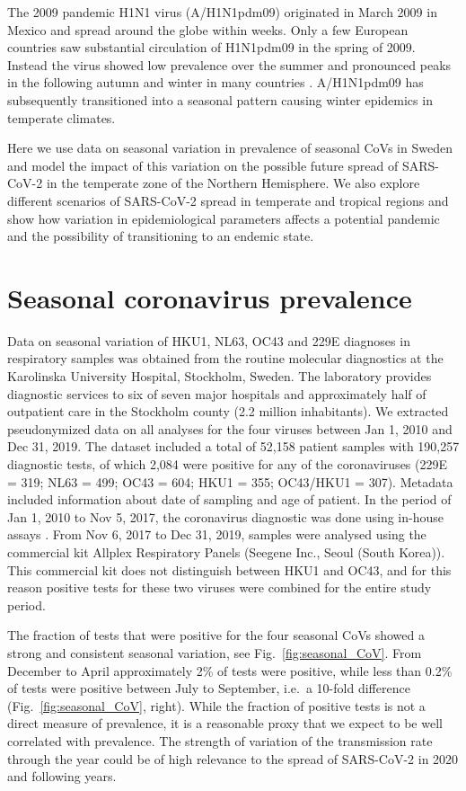\documentclass[rmp, reprint, superscriptaddress, floatfix,amsmath]{revtex4-1}
\begin{document}
The 2009 pandemic H1N1 virus (A/H1N1pdm09) originated in March 2009 in Mexico and spread around the globe within weeks.
Only a few European countries saw substantial circulation of H1N1pdm09 in the spring of 2009. Instead the virus showed low prevalence over the summer and pronounced peaks in the following autumn and winter in many countries \citep{amato-gauci_surveillance_2011}.
A/H1N1pdm09 has subsequently transitioned into a seasonal pattern causing winter epidemics in temperate climates.

Here we use data on seasonal variation in prevalence of seasonal CoVs in Sweden and model the impact of this variation on the possible future spread of SARS-CoV-2 in the temperate zone of the Northern Hemisphere.
We also explore different scenarios of SARS-CoV-2 spread in temperate and tropical regions and show how variation in epidemiological parameters affects a potential pandemic and the possibility of transitioning to an endemic state.

\section{Seasonal coronavirus prevalence}

Data on seasonal variation of HKU1, NL63, OC43 and 229E diagnoses in respiratory samples was obtained from the routine molecular diagnostics at the Karolinska University Hospital, Stockholm, Sweden. The laboratory provides diagnostic services to six of seven major hospitals and approximately half of outpatient care in the Stockholm county (2.2 million inhabitants). We extracted pseudonymized data on all analyses for the four viruses between Jan 1, 2010 and Dec 31, 2019. The dataset included a total of 52,158 patient samples with 190,257 diagnostic tests, of which 2,084 were positive for any of the coronaviruses (229E = 319; NL63 = 499; OC43 = 604; HKU1 = 355; OC43/HKU1 = 307). Metadata included information about date of sampling and age of patient.
In the period of Jan 1, 2010 to Nov 5, 2017, the coronavirus diagnostic was done using in-house assays \citep{tiveljung2009development}. From Nov 6, 2017 to Dec 31, 2019, samples were analysed using the commercial kit Allplex Respiratory Panels (Seegene Inc., Seoul (South Korea)). This commercial kit does not distinguish between HKU1 and OC43, and for this reason positive tests for these two viruses were combined for the entire study period.

The fraction of tests that were positive for the four seasonal CoVs showed a strong and consistent seasonal variation, see Fig.~\ref{fig:seasonal_CoV}.
From December to April approximately 2\%  of tests were positive, while less than 0.2\% of tests were positive between July to September, i.e.~a 10-fold difference (Fig.~\ref{fig:seasonal_CoV}, right).
While the fraction of positive tests is not a direct measure of prevalence, it is a reasonable proxy that we expect to be well correlated with prevalence.
The strength of variation of the transmission rate through the year could be of high relevance to the spread of SARS-CoV-2 in 2020 and following years.
\end{document}
